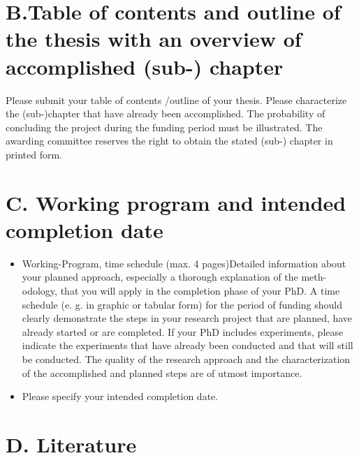 \documentclass[11pt, notitlepage]{article} %
\begin{document}
\newpage
\section*{B.Table of contents and outline of the thesis with an overview of accomplished (sub-) chapter}
Please submit your table of contents /outline of your thesis. Please characterize the (sub-)chapter that have already been accomplished. The probability of concluding the project during the funding period  must  be  illustrated.  The awarding committee reserves the right to obtain the stated (sub-) chapter in printed form.


\newpage
\section*{C. Working program and intended completion date}
\begin{itemize}
    \item Working-Program, time schedule (max. 4 pages)Detailed information about your planned approach, especially a thorough explanation of the meth-odology, that you will apply in the completion phase of your  PhD. A time schedule (e. g. in graphic or  tabular  form)  for  the  period  of  funding  should  clearly  demonstrate  the  steps  in  your  research  project that are planned, have already started or are completed. If your PhD includes experiments, please indicate the experiments that have already been conducted and that will still be conducted. The  quality  of  the  research  approach  and  the  characterization  of  the  accomplished  and  planned  steps are of utmost importance.
    \item Please specify your intended completion date.
\end{itemize}

\newpage
\section*{D. Literature}

\newpage


\end{document}
